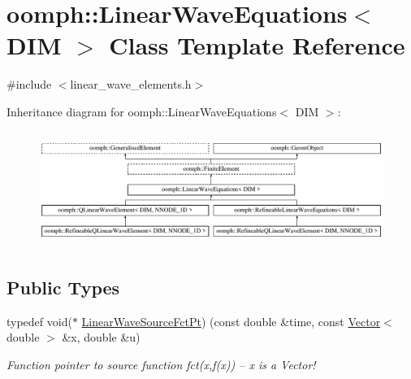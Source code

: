 \hypertarget{classoomph_1_1LinearWaveEquations}{}\section{oomph\+:\+:Linear\+Wave\+Equations$<$ D\+IM $>$ Class Template Reference}
\label{classoomph_1_1LinearWaveEquations}


{\ttfamily \#include $<$linear\+\_\+wave\+\_\+elements.\+h$>$}

Inheritance diagram for oomph\+:\+:Linear\+Wave\+Equations$<$ D\+IM $>$\+:\begin{figure}[H]
\begin{center}
\leavevmode
\includegraphics[height=3.794038cm]{classoomph_1_1LinearWaveEquations}
\end{center}
\end{figure}
\subsection*{Public Types}
\begin{DoxyCompactItemize}
\item 
typedef void($\ast$ \hyperlink{classoomph_1_1LinearWaveEquations_a9648dd63c18bab6854d362d16f01e33d}{Linear\+Wave\+Source\+Fct\+Pt}) (const double \&time, const \hyperlink{classoomph_1_1Vector}{Vector}$<$ double $>$ \&x, double \&u)
\begin{DoxyCompactList}\small\item\em Function pointer to source function fct(x,f(x)) -- x is a Vector! \end{DoxyCompactList}\end{DoxyCompactItemize}
